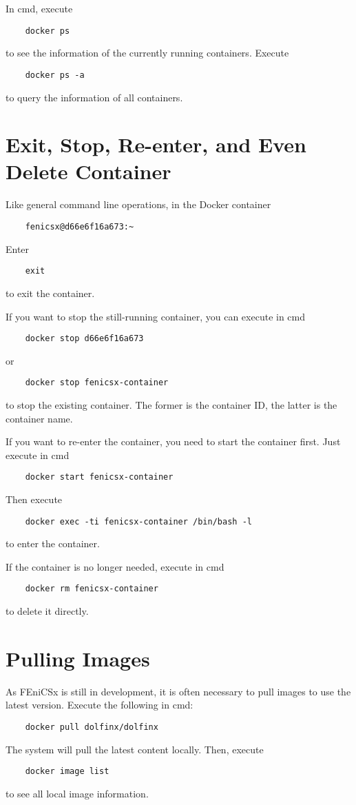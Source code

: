 \documentclass{report}
\begin{document}
In \textsf{cmd}, execute
\begin{lstlisting}
	docker ps
\end{lstlisting}
to see the information of the currently running containers. Execute
\begin{lstlisting}
	docker ps -a
\end{lstlisting}
to query the information of all containers.

\section{Exit, Stop, Re-enter, and Even Delete Container}

Like general command line operations, in the Docker container
\begin{lstlisting}
	fenicsx@d66e6f16a673:~
\end{lstlisting}
Enter
\begin{lstlisting}
	exit
\end{lstlisting}
to exit the container.

If you want to stop the still-running container, you can execute in \textsf{cmd}
\begin{lstlisting}
	docker stop d66e6f16a673
\end{lstlisting}
or
\begin{lstlisting}
	docker stop fenicsx-container
\end{lstlisting}
to stop the existing container. The former is the container ID, the latter is the container name.

If you want to re-enter the container, you need to start the container first. Just execute in \textsf{cmd}
\begin{lstlisting}
	docker start fenicsx-container
\end{lstlisting}
Then execute
\begin{lstlisting}
	docker exec -ti fenicsx-container /bin/bash -l
\end{lstlisting}
to enter the container.

If the container is no longer needed, execute in \textsf{cmd}
\begin{lstlisting}
	docker rm fenicsx-container
\end{lstlisting}
to delete it directly.

\section{Pulling Images}

As FEniCSx is still in development, it is often necessary to pull images to use the latest version. Execute the following in \textsf{cmd}:
\begin{lstlisting}
	docker pull dolfinx/dolfinx
\end{lstlisting}
The system will pull the latest content locally. Then, execute
\begin{lstlisting}
	docker image list
\end{lstlisting}
to see all local image information.
\end{document}
